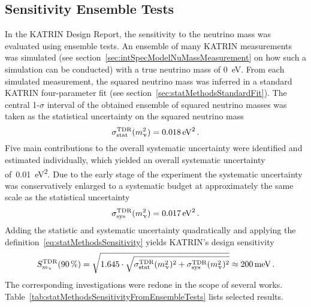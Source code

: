 \subsection{Sensitivity Ensemble Tests}
\label{sec:statMethodsSensitivtyFromEnsemble}
In the KATRIN Design Report, the sensitivity to the neutrino mass was evaluated using ensemble tests. An ensemble of many KATRIN measurements was simulated (see section~\ref{sec:intSpecModelNuMassMeasurement} on how such a simulation can be conducted) with a true neutrino mass of \SI{0}{eV}. From each simulated measurement, the squared neutrino mass was inferred in a standard KATRIN four-parameter fit (see section~\ref{sec:statMethodsStandardFit}). The central 1-$\sigma$ interval of the obtained ensemble of squared neutrino masses was taken as the statistical uncertainty on the squared neutrino mass~\cite{Angrik:2005ep}
\begin{equation}
	\sigma_\mathrm{stat}^\mathrm{TDR}(m_\upnu^2) = \SI{0.018}{eV^2}
	\text{\,.}
\end{equation}
Five main contributions to the overall systematic uncertainty were identified and estimated individually, which yielded an overall systematic uncertainty of~\SI{0.01}{eV^2}. Due to the early stage of the experiment the systematic uncertainty was conservatively enlarged to a systematic budget at approximately the same scale as the statistical uncertainty~\cite{Angrik:2005ep}
\begin{equation}
	\label{eq:statMethodsSensitivtyFromEnsembleTDRSysBudget}
	\sigma_\mathrm{sys}^\mathrm{TDR}(m_\upnu^2) = \SI{0.017}{eV^2}
	\text{\,.}
\end{equation}
Adding the statistic and systematic uncertainty quadratically and applying the definition~\eqref{eq:statMethodsSensitivity} yields KATRIN's design sensitivity~\cite{Angrik:2005ep}
\begin{equation}
	\label{eq:statMethodsSensitivityDesignReport}
	S_{m_\upnu}^{\mathrm{TDR}}(\SI{90}{\percent}) = 
	\sqrt{1.645\cdot
		\sqrt{
		\sigma_\mathrm{stat}^\mathrm{TDR}(m_\upnu^2)^2+\sigma_\mathrm{sys}^\mathrm{TDR}(m_\upnu^2)^2
	}}
	\approx \SI{200}{meV}
	\text{\,.}
\end{equation}
The corresponding investigations were redone in the scope of several works. Table~\ref{tab:statMethodsSensitivityFromEnsembleTests} lists selected results.
